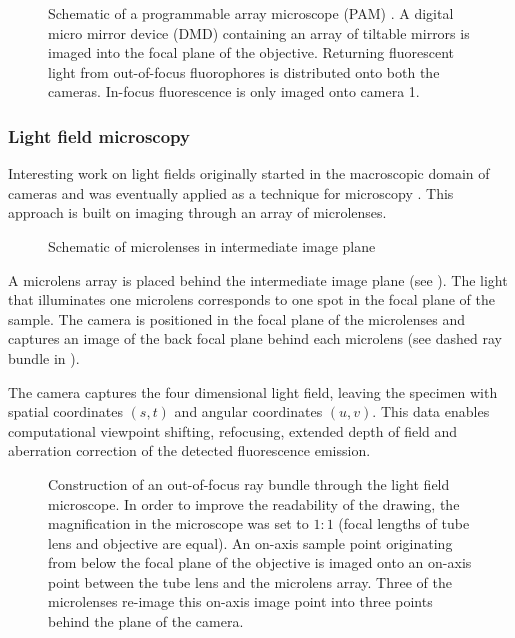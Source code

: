 \begin{figure}[!hbt]
  \centering
  
  \caption{Schematic of a programmable array microscope (PAM)
    \citep[inspired from][]{Verveer1998}. A digital micro mirror
    device (DMD) containing an array of tiltable mirrors is imaged
    into the focal plane of the objective. Returning fluorescent light
    from out-of-focus fluorophores is distributed onto both the
    cameras. In-focus fluorescence is only imaged onto camera 1.}
  \label{fig:pam-sketch}
\end{figure}


%
%
%

\subsubsection{Light field microscopy}
\label{sec:light-field-microscopy}
Interesting work on light fields originally started in the macroscopic
domain of cameras \citep{Lippmann1908%
} and was eventually applied as a technique for microscopy
\citep{Levoy2006,Levoy2009,Zhang2009}. This approach is built on
imaging through an array of microlenses.
\begin{figure}[!hbt]
  \centering
  
  \caption{Schematic of microlenses in intermediate image plane
    \citep[inspired from][]{Levoy2006}}
  \label{fig:microlens-levoy-sketch}
\end{figure}

A microlens array is placed behind the intermediate image plane (see
). The light that illuminates one
microlens corresponds to one spot in the focal plane of the
sample. The camera is positioned in the focal plane of the microlenses
and captures an image of the back focal plane behind each microlens
(see dashed ray bundle in ).

The camera captures the four dimensional light field, leaving the
specimen with spatial coordinates $(s,t)$ and angular coordinates
$(u,v)$. This data enables computational viewpoint shifting,
refocusing, extended depth of field and aberration correction of the
detected fluorescence emission.


\begin{figure}[!hbt]
  \centering
  
  \caption{Construction of an out-of-focus ray bundle through the
    light field microscope. In order to improve the readability of the
    drawing, the magnification in the microscope was set to $1:1$
    (focal lengths of tube lens and objective are equal). An on-axis
    sample point originating from below the focal plane of the
    objective is imaged onto an on-axis point between the tube lens
    and the microlens array. Three of the microlenses re-image this
    on-axis image point into three points behind the plane of the
    camera.}
  \label{fig:microlens-levoy-sketch_2}
\end{figure}

